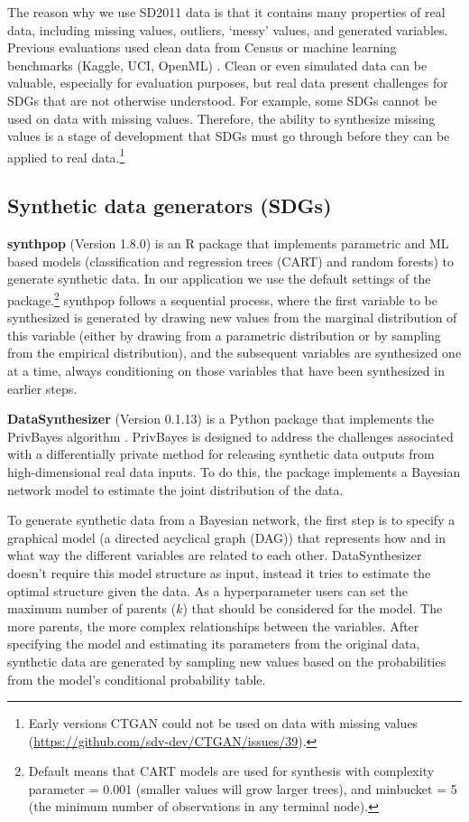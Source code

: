 \documentclass[runningheads]{llncs}
\begin{document}
The reason why we use SD2011 data is that it contains many properties of real data, including missing values, outliers, `messy' values, and generated variables.  Previous evaluations used clean data from Census \cite{little2022comparing} or machine learning benchmarks (Kaggle, UCI, OpenML) \cite{dankar2021fake}.  Clean or even simulated data can be valuable, especially for evaluation purposes, but real data present challenges for SDGs that are not otherwise understood.  For example, some SDGs cannot be used on data with missing values.  Therefore, the ability to synthesize missing values is a stage of development that SDGs must go through before they can be applied to real data.\footnote{Early versions CTGAN could not be used on data with missing values (\url{https://github.com/sdv-dev/CTGAN/issues/39}).}  

\subsection{Synthetic data generators (SDGs)}

{\bf synthpop} (Version 1.8.0) \cite{nowok2016synthpop} is an \textsf{R} package that implements parametric and ML based models (classification and regression trees (CART) and random forests) to generate synthetic data. In our application we use the default settings of the package.\footnote{Default means that CART models are used for synthesis with complexity parameter = 0.001 (smaller values will grow larger trees), and minbucket = 5 (the minimum number of observations in any terminal node).} synthpop follows a sequential process, where the first variable to be synthesized is generated by drawing new values from the marginal distribution of this variable (either by drawing from a parametric distribution or by sampling from the empirical distribution), and the subsequent variables are synthesized one at a time, always conditioning on those variables that have been synthesized in earlier steps. 

{\bf DataSynthesizer} (Version 0.1.13) \cite{ping2017datasynthesizer} is a Python package that implements the PrivBayes algorithm \cite{zhang2017privbayes}.  PrivBayes is designed to address the challenges associated with a differentially private method for releasing synthetic data outputs from high-dimensional real data inputs.  To do this, the package implements a Bayesian network model to estimate the joint distribution of the data.  

To generate synthetic data from a Bayesian network, the first step is to specify a graphical model (a directed acyclical graph (DAG)) that represents how and in what way the different variables are related to each other. DataSynthesizer doesn't require this model structure as input, instead it tries to estimate the optimal structure given the data. As a hyperparameter users can set the maximum number of parents ($k$) that should be considered for the model. The more parents, the more complex relationships between the variables. After specifying the model and estimating its parameters from the original data, synthetic data are generated by sampling new values based on the probabilities from the model's conditional probability table.  
\end{document}
